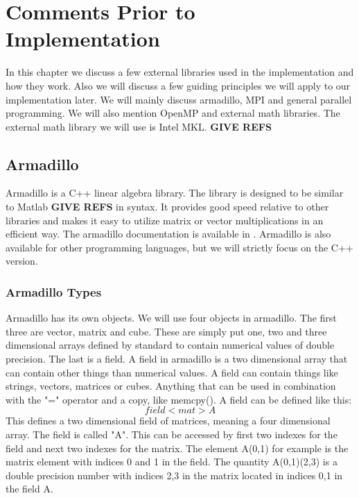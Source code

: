 \documentclass[a4paper,norsk,11pt,twoside]{report}
\begin{document}
\chapter{Comments Prior to Implementation}
In this chapter we discuss a few external libraries used in the
implementation and how they work. Also we will discuss a few guiding
principles we will apply to our implementation later. We will mainly
discuss armadillo, MPI and general parallel programming. We will also
mention OpenMP and external math libraries. The external math library
we will use is Intel MKL.  {\bf GIVE REFS}

\section{Armadillo}
Armadillo \cite{armadillo-ref1} is a C++ linear algebra library. The library
is designed to be similar to Matlab {\bf GIVE REFS} in syntax. It provides good speed
relative to other libraries and makes it easy to utilize matrix or
vector multiplications in an efficient way. The armadillo
documentation is available in \cite{armadillo-ref1}. Armadillo is also
available for other programming languages, but we will strictly focus
on the C++ version.

\subsection{Armadillo Types}
Armadillo has its own objects. We will use four objects in
armadillo. The first three are vector, matrix and cube. These are
simply put one, two and three dimensional arrays defined by standard
to contain numerical values of double precision. The last is a field. A
field in armadillo is a two dimensional array that can contain other
things than numerical values. A field can contain things like strings,
vectors, matrices or cubes. Anything that can be used in combination
with the "=" operator and a copy, like memcpy(). A field can be
defined like this:
\begin{equation}
field<mat> A \nonumber
\end{equation}
This defines a two dimensional field of matrices, meaning a four
dimensional array. The field is called "A". This can be accessed by
first two indexes for the field and next two indexes for the
matrix. The element A(0,1) for example is the matrix element with indices 0 and 1 in the
field. The quantity A(0,1)(2,3) is a double precision number with indices 2,3 in
the matrix located in indices 0,1 in the field A.
\end{document}

